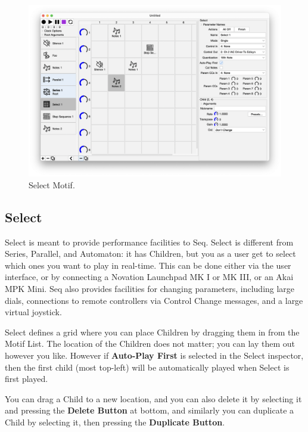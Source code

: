 \documentclass[twoside,10pt]{article}
\begin{document}
\clearpage

\begin{figure}[t]
\centering
\includegraphics[width=6.5in]{Select}
\vspace{-2em}
\caption{Select Motif.}
\label{select}
\end{figure}

\subsection{Select}

Select is meant to provide performance facilities to Seq.  Select is different from Series, Parallel, and Automaton: it has Children, but you as a user get to select which ones you want to play in real-time.  This can be done either via the user interface, or by connecting a Novation Launchpad MK I or MK III, or an Akai MPK Mini.  Seq also provides facilities for changing parameters, including large dials, connections to remote controllers via Control Change messages, and a large virtual joystick.

Select defines a grid where you can place Children by dragging them in from the Motif List.  The location of the Children does not matter; you can lay them out however you like.  However if {\bf Auto-Play First} is selected in the Select inspector, then the first child (most top-left) will be automatically played when Select is first played.

You can drag a Child to a new location, and you can also  delete it by selecting it and pressing the {\bf Delete Button} at bottom, and similarly you can duplicate a Child by selecting it, then pressing the {\bf Duplicate Button}. 
\end{document}
